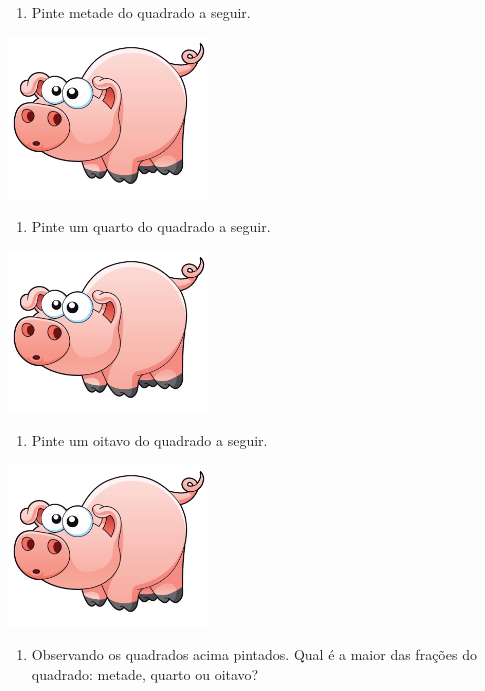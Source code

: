 \documentclass[a4,12pt]{book}
\begin{document}
\begin{enumerate} [\quad a)] %
  \item     Pinte metade do quadrado a seguir.
\end{enumerate} %
\mbox{} \newline  \includegraphics[width=150pt, keepaspectratio]{pig}
\begin{enumerate} [\quad a)] %
  \item     Pinte um quarto do quadrado a seguir.
\end{enumerate} %
\mbox{} \newline  \includegraphics[width=150pt, keepaspectratio]{pig}
\begin{enumerate} [\quad a)] %
  \item     Pinte um oitavo do quadrado a seguir.
\end{enumerate} %
\mbox{} \newline  \includegraphics[width=150pt, keepaspectratio]{pig}
\begin{enumerate} [\quad a)] %
  \item     Observando os quadrados acima pintados. Qual é a maior das frações do quadrado: metade, quarto ou oitavo?
\end{enumerate} %
\end{document}
